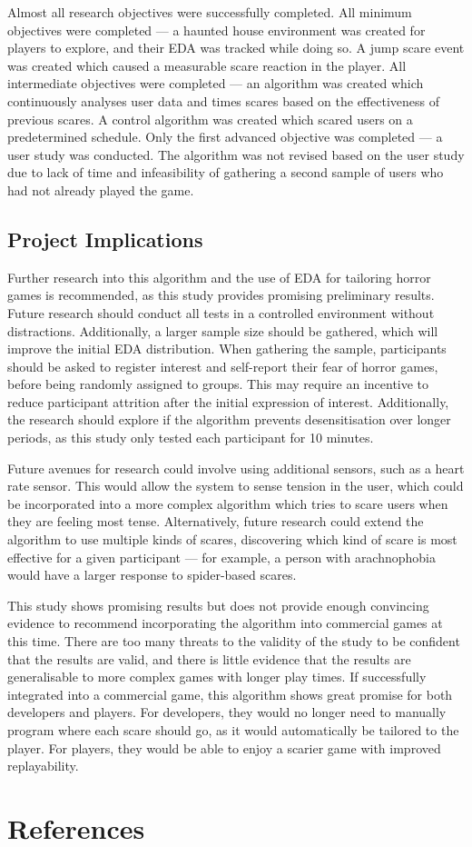 \documentclass[12pt,a4paper]{article}\usepackage[]{graphicx}\usepackage[]{color}
\begin{document}
Almost all research objectives were successfully completed.
All minimum objectives were completed --- a haunted house environment was created for players to explore, and their EDA was tracked while doing so.
A jump scare event was created which caused a measurable scare reaction in the player.
All intermediate objectives were completed --- an algorithm was created which continuously analyses user data and times scares based on the effectiveness of previous scares.
A control algorithm was created which scared users on a predetermined schedule.
Only the first advanced objective was completed --- a user study was conducted.
The algorithm was not revised based on the user study due to lack of time and infeasibility of gathering a second sample of users who had not already played the game.

\subsection{Project Implications}

Further research into this algorithm and the use of EDA for tailoring horror games is recommended, as this study provides promising preliminary results.
Future research should conduct all tests in a controlled environment without distractions.
Additionally, a larger sample size should be gathered, which will improve the initial EDA distribution.
When gathering the sample, participants should be asked to register interest and self-report their fear of horror games, before being randomly assigned to groups.
This may require an incentive to reduce participant attrition after the initial expression of interest.
Additionally, the research should explore if the algorithm prevents desensitisation over longer periods, as this study only tested each participant for 10 minutes.

Future avenues for research could involve using additional sensors, such as a heart rate sensor.
This would allow the system to sense tension in the user, which could be incorporated into a more complex algorithm which tries to scare users when they are feeling most tense.
Alternatively, future research could extend the algorithm to use multiple kinds of scares, discovering which kind of scare is most effective for a given participant --- for example, a person with arachnophobia would have a larger response to spider-based scares.

This study shows promising results but does not provide enough convincing evidence to recommend incorporating the algorithm into commercial games at this time.
There are too many threats to the validity of the study to be confident that the results are valid, and there is little evidence that the results are generalisable to more complex games with longer play times.
If successfully integrated into a commercial game, this algorithm shows great promise for both developers and players.
For developers, they would no longer need to manually program where each scare should go, as it would automatically be tailored to the player.
For players, they would be able to enjoy a scarier game with improved replayability.

\section{References}
\footnotesize
\end{document}
